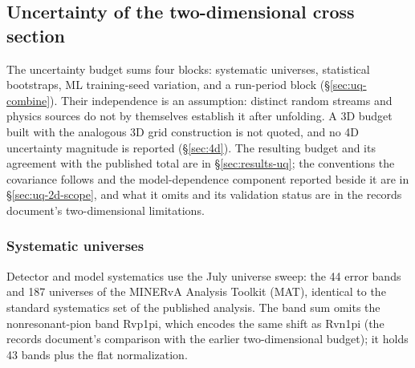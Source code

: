 \subsection{Uncertainty of the two-dimensional cross section}
\label{sec:systematics}

The uncertainty budget sums four blocks: systematic universes, statistical bootstraps, ML training-seed variation, and a run-period block (\S\ref{sec:uq-combine}). Their independence is an assumption: distinct random streams and physics sources do not by themselves establish it after unfolding. A 3D budget built with the analogous 3D grid construction is not quoted, and no 4D uncertainty magnitude is reported (\S\ref{sec:4d}). The resulting budget and its agreement with the published total are in \S\ref{sec:results-uq}; the conventions the covariance follows and the model-dependence component reported beside it are in \S\ref{sec:uq-2d-scope}, and what it omits and its validation status are in the records document's two-dimensional limitations.

\subsubsection{Systematic universes}
\label{sec:uq-universes}
Detector and model systematics use the July universe sweep: the 44 error bands and 187 universes of the MINERvA Analysis Toolkit (MAT), identical to the standard systematics set of the published analysis. The band sum omits the nonresonant-pion band Rvp1pi, which encodes the same shift as Rvn1pi (the records document's comparison with the earlier two-dimensional budget); it holds 43 bands plus the flat normalization.


